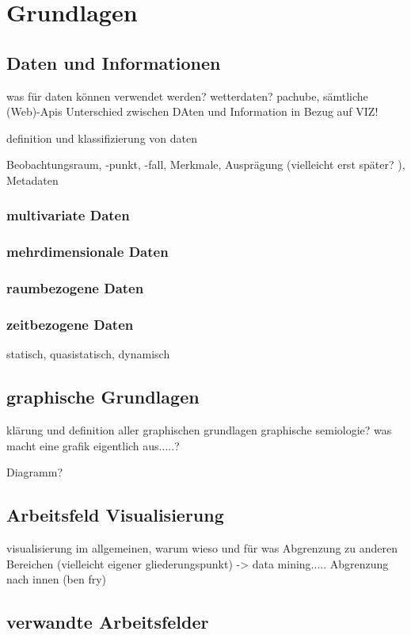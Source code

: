 \documentclass[a4paper, 12pt, onepage, pdftex, headsepline, footsepline]{scrreprt}
\begin{document}
\chapter{Grundlagen}
\section{Daten und Informationen}
was für daten können verwendet werden? wetterdaten? pachube, sämtliche (Web)-Apis
Unterschied zwischen DAten und Information in Bezug auf VIZ!

definition und klassifizierung von daten

Beobachtungsraum, -punkt, -fall, Merkmale, Ausprägung (vielleicht erst später? ), Metadaten

\subsection{multivariate Daten}
\subsection{mehrdimensionale Daten}
\subsection{raumbezogene Daten}
\subsection{zeitbezogene Daten}
statisch, quasistatisch, dynamisch


\section{graphische Grundlagen}

klärung und definition aller graphischen grundlagen
graphische semiologie?
was macht eine grafik eigentlich aus.....?

Diagramm?

\section{Arbeitsfeld Visualisierung}
visualisierung im allgemeinen, warum wieso und für was
Abgrenzung zu anderen Bereichen (vielleicht eigener gliederungspunkt) -> data mining.....
Abgrenzung nach innen (ben fry)
\section{verwandte Arbeitsfelder}
\end{document}
